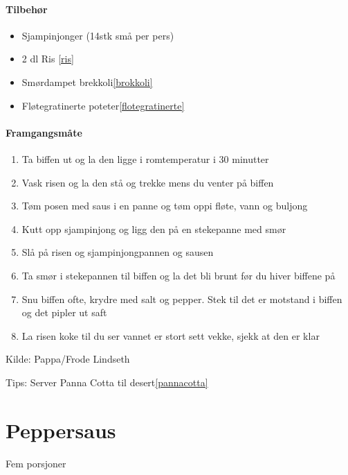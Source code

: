 \documentclass[12pt,a4paper]{book}
\begin{document}
\paragraph{Tilbehør}
\begin{itemize}[noitemsep]
	\item Sjampinjonger (14stk små per pers)
	\item 2 dl Ris \ref{ris}
	\item Smørdampet brekkoli\ref{brokkoli}
	\item Fløtegratinerte poteter\ref{flotegratinerte}
\end{itemize}

\paragraph{Framgangsmåte}
\begin{enumerate}[noitemsep]
	\item Ta biffen ut og la den ligge i romtemperatur i 30 minutter
	\item Vask risen og la den stå og trekke mens du venter på biffen
	\item Tøm posen med saus i en panne og tøm oppi fløte, vann og buljong
	\item Kutt opp sjampinjong og ligg den på en stekepanne med smør
	\item Slå på risen og sjampinjongpannen og sausen
	\item Ta smør i stekepannen til biffen og la det bli brunt før du hiver biffene på
	\item Snu biffen ofte, krydre med salt og pepper. Stek til det er motstand i biffen og det pipler ut saft
	\item La risen koke til du ser vannet er stort sett vekke, sjekk at den er klar
\end{enumerate}

Kilde: Pappa/Frode Lindseth

Tips: Server Panna Cotta til desert\ref{pannacotta}
\clearpage{}
\clearpage{}\section{﻿Peppersaus}
\label{peppersaus}
Fem porsjoner
\end{document}
